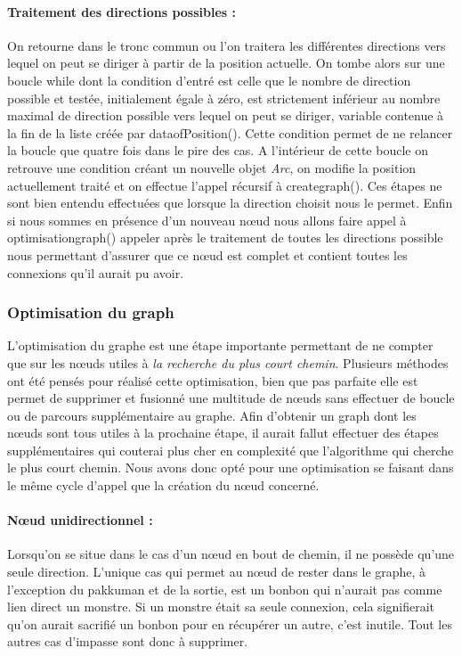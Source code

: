 \documentclass[12pt, oneside]{article}
\begin{document}
\paragraph{Traitement des directions possibles :}
On retourne dans le tronc commun ou l’on traitera les différentes directions vers lequel on peut se diriger à partir de la position actuelle. On tombe alors sur une boucle while dont la condition d’entré est celle que le nombre de direction possible et testée, initialement égale à zéro, est strictement inférieur au nombre maximal de direction possible vers lequel on peut se diriger, variable contenue à la fin de la liste créée par data\textunderscore ofPosition(). Cette condition permet de ne relancer la boucle que quatre fois dans le pire des cas. 
A l’intérieur de cette boucle on retrouve une condition créant un nouvelle objet \emph{Arc}, on modifie la position actuellement traité et on effectue l’appel récursif à create\textunderscore graph(). Ces étapes ne sont bien entendu effectuées que lorsque la direction choisit nous le permet. 
Enfin si nous sommes en présence d’un nouveau nœud nous allons faire appel à optimisation\textunderscore graph()  appeler après le traitement de toutes les directions possible nous permettant d’assurer que ce nœud est complet et contient toutes les connexions qu’il aurait pu avoir.

\subsubsection{Optimisation du graph}
L’optimisation du graphe est une étape importante permettant de ne compter que sur les nœuds utiles à \emph{la recherche du plus court chemin}. Plusieurs méthodes ont été pensés pour réalisé cette optimisation, bien que pas parfaite elle est permet de supprimer et fusionné une multitude de nœuds sans effectuer de boucle ou de parcours supplémentaire au graphe. Afin d’obtenir un graph dont les nœuds sont tous utiles à la prochaine étape, il aurait fallut effectuer des étapes supplémentaires qui couterai plus cher en complexité que l’algorithme qui cherche le plus court chemin. 
Nous avons donc opté pour une optimisation se faisant dans le même cycle d’appel que la création du nœud concerné. 

\paragraph{Nœud unidirectionnel :}
Lorsqu’on se situe dans le cas d’un nœud en bout de chemin, il ne possède qu’une seule direction. L’unique cas qui permet au nœud de rester dans le graphe, à l’exception du pakkuman et de la sortie, est un bonbon qui n’aurait pas comme lien direct un monstre. Si un monstre était sa seule connexion, cela signifierait qu’on aurait sacrifié un bonbon pour en récupérer un autre, c’est inutile. Tout les autres cas d’impasse sont donc à supprimer.
\end{document}
